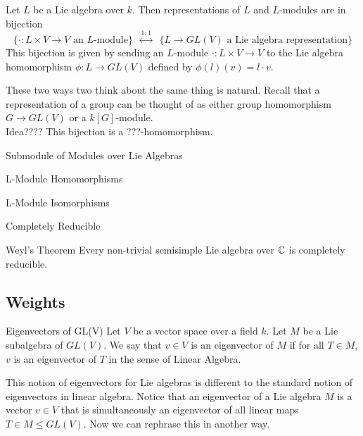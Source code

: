 \documentclass[a4paper]{article}
\begin{document}
\begin{prp}{}{} Let $L$ be a Lie algebra over $k$. Then representations of $L$ and $L$-modules are in bijection $$\{\cdot:L\times V\to V\text{ an }L\text{-module}\}\;\;\overset{1:1}{\leftrightarrow}\;\;\{L\to GL(V)\text{ a Lie algebra representation}\}$$ This bijection is given by sending an $L$-module $\cdot:L\times V\to V$ to the Lie algebra homomorphism $\phi:L\to GL(V)$ defined by $\phi(l)(v)=l\cdot v$. 
\end{prp}

These two ways two think about the same thing is natural. Recall that a representation of a group can be thought of as either group homomorphism $G\to GL(V)$ or a $k[G]$-module. \\

Idea???? This bijection is a ???-homomorphism. 

\begin{defn}{Submodule of Modules over Lie Algebras}{}
\end{defn}

\begin{defn}{L-Module Homomorphisms}{}
\end{defn}

\begin{defn}{L-Module Isomorphisms}{}
\end{defn}

\begin{defn}{Completely Reducible}{}
\end{defn}

\begin{thm}{Weyl's Theorem}{} Every non-trivial semisimple Lie algebra over $\mathbb{C}$ is completely reducible. 
\end{thm}

\subsection{Weights}
\begin{defn}{Eigenvectors of GL(V)}{} Let $V$ be a vector space over a field $k$. Let $M$ be a Lie subalgebra of $GL(V)$. We say that $v\in V$ is an eigenvector of $M$ if for all $T\in M$, $v$ is an eigenvector of $T$ in the sense of Linear Algebra. 
\end{defn}

This notion of eigenvectors for Lie algebras is different to the standard notion of eigenvectors in linear algebra. Notice that an eigenvector of a Lie algebra $M$ is a vector $v\in V$ that is simultaneously an eigenvector of all linear maps $T\in M\leq GL(V)$. Now we can rephrase this in another way. 
\end{document}
